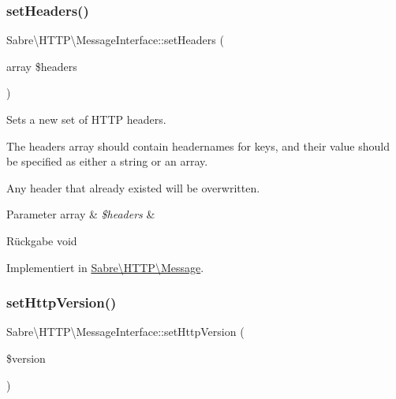 \mbox{\label{interface_sabre_1_1_h_t_t_p_1_1_message_interface_afd622b82029b37f47af76f83b17ba12f}} 
\subsubsection{\texorpdfstring{set\+Headers()}{setHeaders()}}
{\footnotesize\ttfamily Sabre\textbackslash{}\+H\+T\+T\+P\textbackslash{}\+Message\+Interface\+::set\+Headers (\begin{DoxyParamCaption}\item[{array}]{\$headers }\end{DoxyParamCaption})}

Sets a new set of H\+T\+TP headers.

The headers array should contain headernames for keys, and their value should be specified as either a string or an array.

Any header that already existed will be overwritten.


\begin{DoxyParams}[1]{Parameter}
array & {\em \$headers} & \\
\hline
\end{DoxyParams}
\begin{DoxyReturn}{Rückgabe}
void 
\end{DoxyReturn}


Implementiert in \mbox{\hyperlink{class_sabre_1_1_h_t_t_p_1_1_message_abe99bdab90115cca0489dc36037ef872}{Sabre\textbackslash{}\+H\+T\+T\+P\textbackslash{}\+Message}}.

\mbox{\label{interface_sabre_1_1_h_t_t_p_1_1_message_interface_a3b078aad665c00c171bc2a9b7ac05d6d}} 
\subsubsection{\texorpdfstring{set\+Http\+Version()}{setHttpVersion()}}
{\footnotesize\ttfamily Sabre\textbackslash{}\+H\+T\+T\+P\textbackslash{}\+Message\+Interface\+::set\+Http\+Version (\begin{DoxyParamCaption}\item[{}]{\$version }\end{DoxyParamCaption})}

